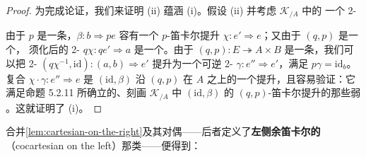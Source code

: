 \begin{proof}
为完成论证，我们来证明 (ii) 蕴涵 (i)。假设 (ii) 并考虑 $\mathcal{K}_{/A}$ 中的
一个 2-\trCell
\begin{center}
\end{center}
由于 $p$ 是一条\trCartesianFibration{}，$\beta\colon b\Rightarrow pe$ 容有一个
$p$-笛卡尔提升 $\chi\colon e'\Rightarrow e$；又由于 $(q,p)$ 是一个\trCartesianFunctor{}，
须化后的 2-\trCell{} $q\chi\colon qe'\Rightarrow a$ 是一个\trIsomorphism{}。由于
$(q,p)\colon E\twoheadrightarrow A\times B$ 是一条\trIsofibration{}，我们可以把
2-\trCell{} $(q\chi^{-1},\mathrm{id})\colon(a,b)\Rightarrow e'$ 提升为一个可逆
2-\trCell{} $\gamma\colon e''\Rightarrow e'$，满足 $p\gamma=\mathrm{id}_{b}$。
复合 $\chi\cdot\gamma\colon e''\Rightarrow e$ 是 $(\mathrm{id},\beta)$ 沿
$(q,p)$ 在 $A$ 之上的一个提升，且容易验证：它满足命题 5.2.11 所确立的、刻画
$\mathcal{K}_{/A}$ 中 $(\mathrm{id},\beta)$ 的 $(q,p)$-笛卡尔提升的那些弱%
\trUniversalProperty{}。这就证明了 (i)。
\end{proof}

合并\cref{lem:cartesian-on-the-right}及其对偶——后者定义了\textbf{左侧余笛卡尔的}
（cocartesian on the left）那类\trTwoSidedIsofibration——便得到：

